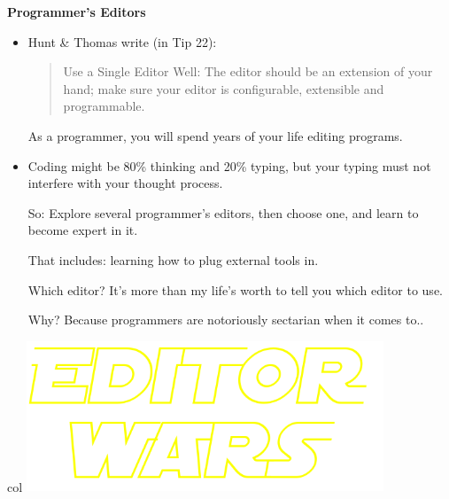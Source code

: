 \documentclass[handout]{beamer}
\newcommand\myheading[1]{%
  \par\bigskip
  {\Large\bfseries#1}\par\smallskip}
\begin{document}
\begin{frame}
  \myheading{Programmer's Editors}
  \begin{itemize}
    \item
	  Hunt \& Thomas write (in Tip 22):
\begin{quote}
Use a Single Editor Well:
The editor should be an extension of your hand;
make sure your editor is configurable,
extensible and programmable.
\end{quote}
    \pitem
    As a programmer, you will spend \alert{years of your life} editing programs.

    \item
    Coding might be 80\% thinking and 20\% typing, but your
    typing must not interfere with your thought process.

    \pitem
    So: Explore several programmer's editors, then choose one,
    and learn to become \alert{expert in it}.

    \pitem
    That includes: learning \alert{how to plug external tools in}.

    \pitem
    Which editor?
    \pause
    It's more than my life's worth to tell you which editor to use.

    \pitem
    Why? Because programmers are notoriously sectarian when it comes to..
  \end{itemize}
\end{frame}

\begin{frame}[plain]
\begin{beamercolorbox}[wd=1.1\textwidth, ht=1.1\textheight]{col}
\centering
\vspace{70pt}
\includegraphics[width=0.8\textwidth]{editorWars.png}
\end{beamercolorbox}
\end{frame}
\end{document}
